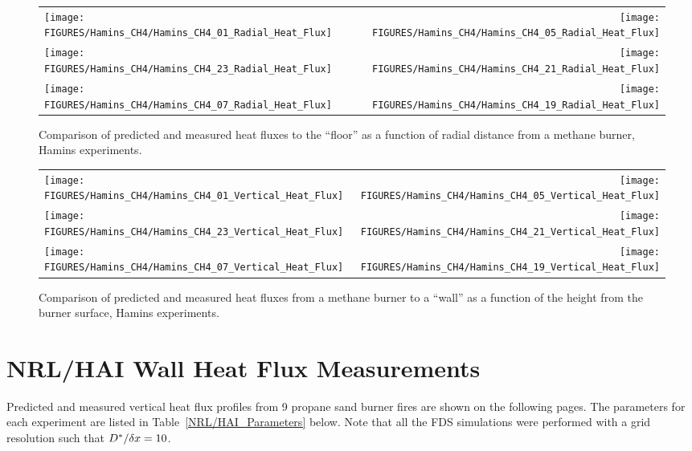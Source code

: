 \newpage

\begin{figure}[p]
\begin{tabular*}{\textwidth}{l@{\extracolsep{\fill}}r}
\texttt{[image: FIGURES/Hamins\_CH4/Hamins\_CH4\_01\_Radial\_Heat\_Flux]} &
\texttt{[image: FIGURES/Hamins\_CH4/Hamins\_CH4\_05\_Radial\_Heat\_Flux]} \\
\texttt{[image: FIGURES/Hamins\_CH4/Hamins\_CH4\_23\_Radial\_Heat\_Flux]} &
\texttt{[image: FIGURES/Hamins\_CH4/Hamins\_CH4\_21\_Radial\_Heat\_Flux]} \\
\texttt{[image: FIGURES/Hamins\_CH4/Hamins\_CH4\_07\_Radial\_Heat\_Flux]} &
\texttt{[image: FIGURES/Hamins\_CH4/Hamins\_CH4\_19\_Radial\_Heat\_Flux]}
\end{tabular*}
\label{Hamins_CH4_Radial}
\caption[Radial heat flux predictions, Hamins methane burner experiments.]
{Comparison of predicted and measured heat fluxes to the ``floor'' as a function of radial distance from a methane burner, Hamins experiments.}
\end{figure}

\begin{figure}[p]
\begin{tabular*}{\textwidth}{l@{\extracolsep{\fill}}r}
\texttt{[image: FIGURES/Hamins\_CH4/Hamins\_CH4\_01\_Vertical\_Heat\_Flux]} &
\texttt{[image: FIGURES/Hamins\_CH4/Hamins\_CH4\_05\_Vertical\_Heat\_Flux]} \\
\texttt{[image: FIGURES/Hamins\_CH4/Hamins\_CH4\_23\_Vertical\_Heat\_Flux]} &
\texttt{[image: FIGURES/Hamins\_CH4/Hamins\_CH4\_21\_Vertical\_Heat\_Flux]} \\
\texttt{[image: FIGURES/Hamins\_CH4/Hamins\_CH4\_07\_Vertical\_Heat\_Flux]} &
\texttt{[image: FIGURES/Hamins\_CH4/Hamins\_CH4\_19\_Vertical\_Heat\_Flux]}
\end{tabular*}
\label{Hamins_CH4_Vertical}
\caption[Vertical heat flux predictions, Hamins methane burner experiments.]
{Comparison of predicted and measured heat fluxes from a methane burner to a ``wall'' as a function of the height from the burner surface, Hamins experiments.}
\end{figure}

\clearpage


\section{NRL/HAI Wall Heat Flux Measurements}

Predicted and measured vertical heat flux profiles from 9 propane sand burner fires are shown on the following pages.
The parameters for each
experiment are listed in Table~\ref{NRL/HAI_Parameters} below. Note that all the FDS simulations were performed with
a grid resolution such that
$D^*/\delta x=10$.

